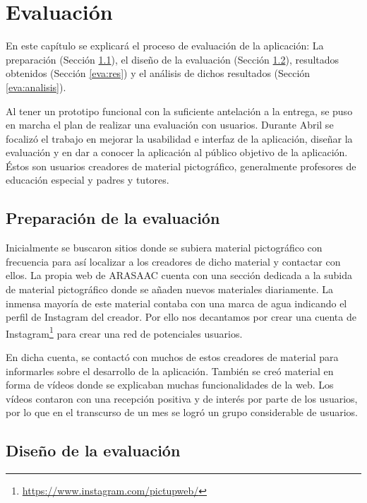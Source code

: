 \chapter{Evaluación}
\label{cap:evaluacion}



\begin{resumen}
	 En este capítulo se explicará el proceso de evaluación de la aplicación: La preparación (Sección \ref{eva:prep}), el diseño de la evaluación (Sección \ref{eva:dis}), resultados obtenidos (Sección \ref{eva:res}) y el análisis de dichos resultados (Sección \ref{eva:analisis}).  
	
\end{resumen}

Al tener un prototipo funcional con la suficiente antelación a la entrega, se puso en marcha el plan de realizar una evaluación con usuarios. Durante Abril se focalizó el trabajo en mejorar la usabilidad e interfaz de la aplicación, diseñar la evaluación y en dar a conocer la aplicación al público objetivo de la aplicación. Éstos son usuarios creadores de material pictográfico, generalmente profesores de educación especial y padres y tutores. 


\section{Preparación de la evaluación}
\label{eva:prep}


Inicialmente se buscaron sitios donde se subiera material pictográfico con frecuencia para así localizar a los creadores de dicho material y contactar con ellos. La propia web de ARASAAC cuenta con una sección dedicada a la subida de material pictográfico donde se añaden nuevos materiales diariamente. La inmensa mayoría de este material contaba con una marca de agua indicando el perfil de Instagram del creador. Por ello nos decantamos por crear una cuenta de Instagram\footnote{\url{https://www.instagram.com/pictupweb/}} para crear una red de potenciales usuarios. 

En dicha cuenta, se contactó con muchos de estos creadores de material para informarles sobre el desarrollo de la aplicación. También se creó material en forma de vídeos donde se explicaban muchas funcionalidades de la web. Los vídeos contaron con una recepción positiva y de interés por parte de los usuarios, por lo que en el transcurso de un mes se logró un grupo considerable de usuarios.
\section{Diseño de la evaluación}
\label{eva:dis}

